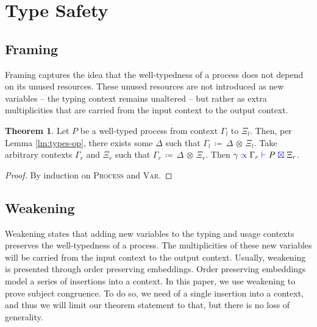 \documentclass[a4paper,UKenglish,cleveref, autoref, thm-restate,authorcolumns]{lipics-v2019}
\theoremstyle{definition}
\newtheorem{nitheorem}[theorem]{Theorem}
\newcommand{\type}[1]{\textcolor{blue}{\operatorname{#1}}}
\newcommand{\opctx}[3]{#1 \, \coloneqq \, #2 \, \otimes \, #3}
\newcommand{\types}[4]{#1 \; \type{\propto} \; #2 \; \type{\vdash} \; #3 \; \type{\boxtimes} \; #4}
\begin{document}
\section{Type Safety}
\label{type-safety}


\subsection{Framing}
\label{framing}

Framing captures the idea that the well-typedness of a process does not depend on its unused resources.
These unused resources are not introduced as new variables -- the typing context remains unaltered -- but rather as extra multiplicities that are carried from the input context to the output context.

\begin{nitheorem}
  \label{thm:framing}
  Let $P$ be a well-typed process from context $\Gamma_l$ to $\Xi_l$.
  Then, per Lemma \ref{lm:types-op}, there exists some $\Delta$ such that $\opctx{\Gamma_l}{\Delta}{\Xi_l}$.
  Take arbitrary contexts $\Gamma_r$ and $\Xi_r$ such that $\opctx{\Gamma_r}{\Delta}{\Xi_r}$.
  Then $\types{\gamma}{\Gamma_r}{P}{\Xi_r}$.
\end{nitheorem}
\begin{proof}
  By induction on \textsc{Process} and \textsc{Var}.
\end{proof}

\subsection{Weakening}
\label{weakening}

Weakening states that adding new variables to the typing and usage contexts preserves the well-typedness of a process.
The multiplicities of these new variables will be carried from the input context to the output context.
Usually, weakening is presented through order preserving embeddings.
Order preserving embeddings model a series of insertions into a context.
In this paper, we use weakening to prove subject congruence.
To do so, we need of a single insertion into a context, and thus we will limit our theorem statement to that, but there is no loss of generality.
\end{document}
